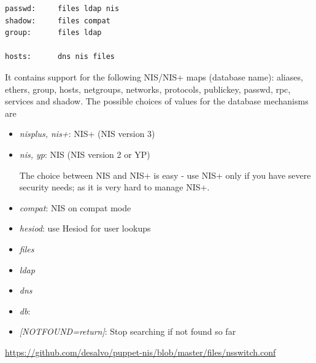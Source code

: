 \begin{verbatim}
passwd:     files ldap nis
shadow:     files compat
group:      files ldap

hosts:      dns nis files
\end{verbatim}
It contains support for the following NIS/NIS+ maps (database name):
aliases, ethers, group, hosts, netgroups, networks, protocols, publickey,
passwd, rpc, services and shadow. The possible choices of values for the
database mechanisms are 
\begin{itemize}
  
  \item {\it nisplus, nis+}: NIS+ (NIS version 3)
  
  \item {\it nis, yp}: NIS (NIS version 2 or YP)

The choice between NIS and NIS+ is easy - use NIS+ only if you have severe
security needs; as it is very hard to manage NIS+.
  
  \item {\it compat}: NIS on compat mode
  
  \item {\it hesiod}: use Hesiod for user lookups 
  
  \item {\it files}
  
  \item {\it ldap}
  
  \item {\it dns}
  
  \item {\it db}: 
  \item {\it [NOTFOUND=return]}: Stop searching if not found so far
\end{itemize}
\url{https://github.com/desalvo/puppet-nis/blob/master/files/nsswitch.conf}


